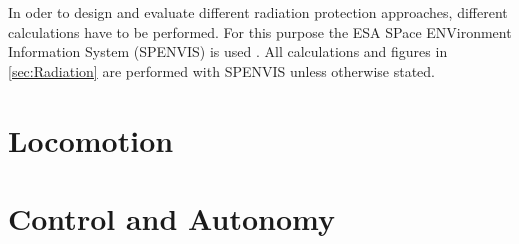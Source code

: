 In oder to design and evaluate different radiation protection approaches, different calculations have to be performed. For this purpose the ESA SPace ENVironment Information System (SPENVIS) is used \cite{Platzhalter}. All calculations and figures in \autoref{sec:Radiation} are performed with SPENVIS unless otherwise stated.

\section{Locomotion}
\label{sec:locomotion}



\section{Control and Autonomy}
\label{sec:ControlandAutonomy}

\cleardoublepage